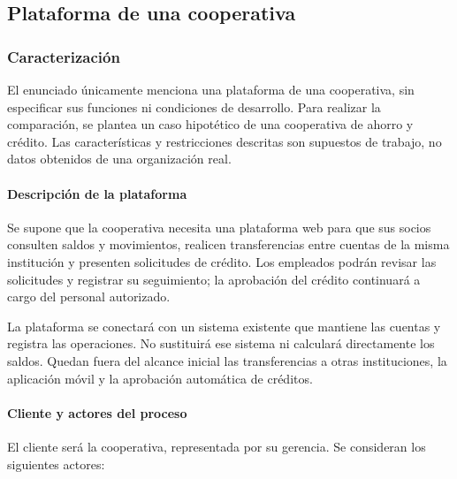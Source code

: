 \subsection{Plataforma de una cooperativa}

\subsubsection{Caracterización}

El enunciado únicamente menciona una plataforma de una cooperativa, sin especificar sus funciones ni condiciones de desarrollo. Para realizar la comparación, se plantea un caso hipotético de una cooperativa de ahorro y crédito. Las características y restricciones descritas son supuestos de trabajo, no datos obtenidos de una organización real.

\paragraph{Descripción de la plataforma}

Se supone que la cooperativa necesita una plataforma web para que sus socios consulten saldos y movimientos, realicen transferencias entre cuentas de la misma institución y presenten solicitudes de crédito. Los empleados podrán revisar las solicitudes y registrar su seguimiento; la aprobación del crédito continuará a cargo del personal autorizado.

La plataforma se conectará con un sistema existente que mantiene las cuentas y registra las operaciones. No sustituirá ese sistema ni calculará directamente los saldos. Quedan fuera del alcance inicial las transferencias a otras instituciones, la aplicación móvil y la aprobación automática de créditos.

\paragraph{Cliente y actores del proceso}

El cliente será la cooperativa, representada por su gerencia. Se consideran los siguientes actores:

